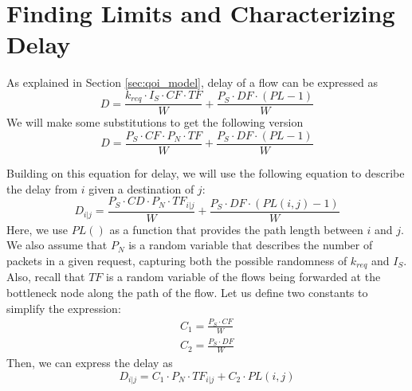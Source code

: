 \section{Finding Limits and Characterizing Delay}
\label{sec:delay_char}

%

As explained in Section \ref{sec:qoi_model}, delay of a flow can be expressed as
\begin{equation}
	D = \frac{ k_{req} \cdot I_S \cdot CF \cdot TF}{W} + \frac{P_S \cdot DF \cdot (PL-1)}{W}
\end{equation}
We will make some substitutions to get the following version
\begin{equation}
	D = \frac{ P_S \cdot CF \cdot P_N \cdot TF}{W} + \frac{P_S \cdot DF \cdot (PL-1)}{W}
\end{equation}

Building on this equation for delay, we will use the following equation to describe the delay from $i$ given a destination of $j$:
\begin{equation}
	D_{i | j} = \frac{ P_S \cdot CD \cdot P_N \cdot TF_{i | j}}{W}  + \frac{P_S \cdot DF \cdot (PL(i,j)-1)}{W}
\end{equation}
Here, we use $PL()$ as a function that provides the path length between $i$ and $j$.  We also assume that $P_N$ is a random variable that describes the number of packets in a given request, capturing both the possible randomness of $k_{req}$ and $I_S$.  Also, recall that $TF$ is a random variable of the flows being forwarded at the bottleneck node along the path of the flow.  Let us define two constants to simplify the expression:
\begin{eqnarray*}
	C_1 = \frac{P_S \cdot CF}{W} \\
	C_2 = \frac{P_S \cdot DF}{W}
\end{eqnarray*}
Then, we can express the delay as
\begin{equation}
	D_{i | j} = C_1 \cdot P_N \cdot TF_{i | j} + C_2 \cdot PL(i,j)
\end{equation}

